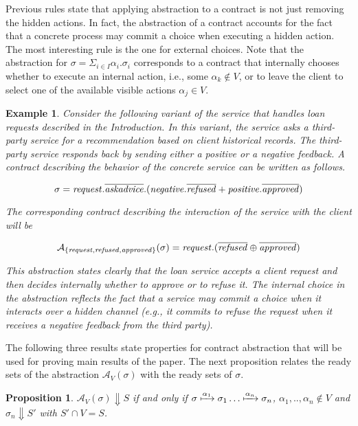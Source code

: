 \documentclass[submission,copyright,creativecommons]{eptcs}
\newtheorem{proposition}{Proposition}
\newtheorem{example}{Example}
\begin{document}
Previous rules state that applying abstraction to a contract is not just removing the 
hidden actions. In fact, the abstraction of a contract accounts for the fact that a concrete 
process may commit a choice when executing a hidden action. The most interesting rule is the one for 
external choices. Note that the abstraction for $\sigma = \Sigma_{i\in I} \alpha_i.\sigma_i$ corresponds to a
contract that internally chooses whether to execute an internal action, i.e., some $\alpha_k\not\in V$,
or to leave the client to select one of the available visible actions $\alpha_j\in V$.

\begin{example} Consider the following variant of the service that handles loan requests  
described in the Introduction. In this variant, the service asks a third-party service for a recommendation based on client historical records. The third-party service 
responds back by sending either a positive or 
a negative feedback. A contract describing the behavior of the concrete service can be 
written as follows.

\[
   \sigma = {\it request}.\overline{\it askadvice}.({\it negative}.\overline{\it refused} + {\it positive}.\overline{\it approved}) 
\]

The corresponding contract describing the interaction of the service with the client
will be

\[
   \mathcal{A}_{\{ {\it request,refused, approved}\}}(\sigma) = {\it request}.(\overline{\it refused} \oplus \overline{\it approved}) 
\]

This abstraction states clearly that the loan service accepts a client 
request and then decides internally whether to approve or to refuse it. The internal 
choice in the abstraction reflects the fact that a service may commit a choice when it 
interacts over a hidden channel (e.g., it commits to refuse the request when it receives a 
negative feedback from the third party).
\end{example}

The following three results state properties for contract abstraction that will be used for 
proving main results of the paper. The next proposition relates the ready sets of the 
abstraction $\mathcal{A}_V(\sigma)$ with the ready sets of $\sigma$.



\begin{proposition} 
\label{seqofhiddenreductions}
  $\mathcal{A}_V(\sigma) \Downarrow S$ if and only if
$\sigma\xmapsto{\alpha_1}\sigma_1\ldots\xmapsto{\alpha_n}\sigma_n$, $\alpha_1,..,\alpha_n \not\in V$ and 
$\sigma_n\Downarrow S'$ with $S'\cap V = S$.
\end{proposition}
\end{document}
